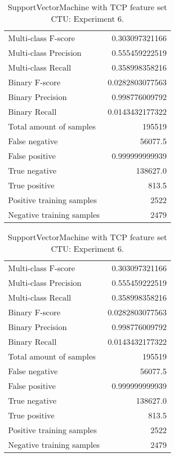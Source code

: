 \begin{table}[H]
\begin{minipage}{0.5\textwidth}
\caption{SupportVectorMachine with TCP feature set CTU: Experiment 5.}
\centering
\begin{tabular}{l r}
\toprule
Multi-class F-score & 0.303097321166 \\
Multi-class Precision & 0.555459222519 \\
Multi-class Recall & 0.358998358216 \\
\midrule
Binary F-score & 0.0282803077563 \\
Binary Precision & 0.998776009792 \\
Binary Recall & 0.0143432177322 \\
\midrule
Total amount of samples & 195519 \\
False negative & 56077.5 \\
False positive & 0.999999999939 \\
True negative & 138627.0 \\
True positive & 813.5 \\
\midrule
Positive training samples & 2522 \\
Negative training samples & 2479 \\
\bottomrule
\end{tabular}
\end{minipage}
\hfillx
\begin{minipage}{0.5\textwidth}
\caption{SupportVectorMachine with TCP feature set CTU: Experiment 6.}
\centering
\begin{tabular}{l r}
\toprule
Multi-class F-score & 0.303097321166 \\
Multi-class Precision & 0.555459222519 \\
Multi-class Recall & 0.358998358216 \\
\midrule
Binary F-score & 0.0282803077563 \\
Binary Precision & 0.998776009792 \\
Binary Recall & 0.0143432177322 \\
\midrule
Total amount of samples & 195519 \\
False negative & 56077.5 \\
False positive & 0.999999999939 \\
True negative & 138627.0 \\
True positive & 813.5 \\
\midrule
Positive training samples & 2522 \\
Negative training samples & 2479 \\
\bottomrule
\end{tabular}
\end{minipage}
\end{table}
